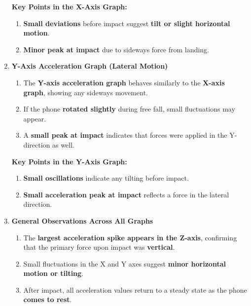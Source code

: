 \documentclass[idxtotoc,hyperref,openany]{labbook} %
\begin{document}
\begin{enumerate}
\begin{enumerate}[$\bullet$]
    \end{enumerate}
    \textbf{Key Points in the X-Axis Graph:}
    \begin{enumerate}[$\bullet$]
        \item \textbf{Small deviations} before impact suggest \textbf{tilt or slight horizontal motion}.
        \item \textbf{Minor peak at impact} due to sideways force from landing.
    \end{enumerate}
    \item \textbf{Y-Axis Acceleration Graph (Lateral Motion)}
    \begin{enumerate}[$\bullet$]
        \item The \textbf{Y-axis acceleration graph} behaves similarly to the \textbf{X-axis graph}, showing any sideways movement.
        \item If the phone \textbf{rotated slightly} during free fall, small fluctuations may appear.
        \item A \textbf{small peak at impact} indicates that forces were applied in the Y-direction as well.
    \end{enumerate}
    \textbf{Key Points in the Y-Axis Graph:}
    \begin{enumerate}[$\bullet$]
        \item \textbf{Small oscillations} indicate any tilting before impact.
        \item \textbf{Small acceleration peak at impact} reflects a force in the lateral direction.
    \end{enumerate}
    \item \textbf{General Observations Across All Graphs}
    \begin{enumerate}[$\bullet$]
        \item The \textbf{largest acceleration spike appears in the Z-axis}, confirming that the primary force upon impact was \textbf{vertical}.
        \item Small fluctuations in the X and Y axes suggest \textbf{minor horizontal motion or tilting}.
        \item After impact, all acceleration values return to a steady state as the phone \textbf{comes to rest}.
    \end{enumerate}
\end{enumerate}

\end{document}
